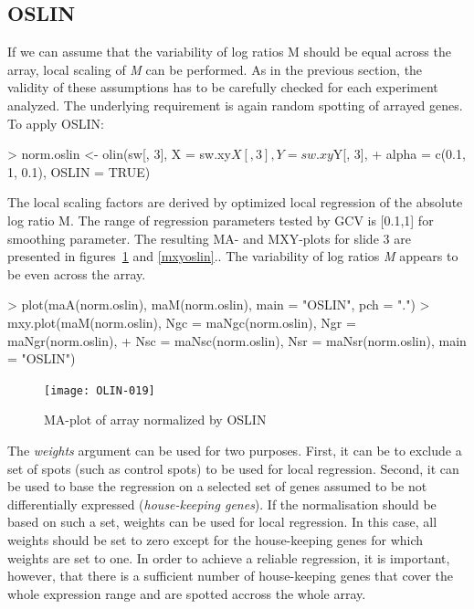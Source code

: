 \documentclass[a4paper,11pt]{article}
\begin{document}



\subsection{OSLIN} 
If we can assume that the variability of log ratios M should be equal across the array,
 local scaling of \emph{M} can be performed. As in the previous section, the validity of these assumptions
 has to be carefully checked for each experiment analyzed. The underlying requirement is again random 
spotting of arrayed genes. To apply OSLIN:

\begin{Schunk}
\begin{Sinput}
> norm.oslin <- olin(sw[, 3], X = sw.xy$X[, 3], Y = sw.xy$Y[, 3], 
+     alpha = c(0.1, 1, 0.1), OSLIN = TRUE)
\end{Sinput}
\end{Schunk}

The local scaling factors are  derived by optimized local regression of the absolute log ratio M. 
The range of regression  parameters tested by GCV is [0.1,1] for smoothing parameter. 
The resulting MA- and MXY-plots for slide 3 are presented in figures~\ref{maoslin} and \ref{mxyoslin}.. 
The variability of log ratios \emph{M} appears to be even across the array.


\begin{Schunk}
\begin{Sinput}
> plot(maA(norm.oslin), maM(norm.oslin), main = "OSLIN", pch = ".")
> mxy.plot(maM(norm.oslin), Ngc = maNgc(norm.oslin), Ngr = maNgr(norm.oslin), 
+     Nsc = maNsc(norm.oslin), Nsr = maNsr(norm.oslin), main = "OSLIN")
\end{Sinput}
\end{Schunk}



\begin{figure}[t]
\centering
\texttt{[image: OLIN-019]}
\caption{MA-plot of array normalized by  OSLIN }
\label{maoslin}
\end{figure}

The \emph{weights} argument can be used for two purposes. First, it can be 
to exclude a set of spots (such as control spots)  to be used  for local regression. Second, it can be used 
to base the regression on a selected set of genes assumed to be not differentially expressed (\emph{house-keeping
genes}).  
If the normalisation should be based on such a set, weights can be used for local regression. 
In this case, all weights should be  set to zero except for
the house-keeping genes for which weights are set to one. In order to achieve a reliable regression, it is important, however, that there is a sufficient number of house-keeping genes that  cover the whole expression range
and are spotted accross the whole array.
\end{document}
